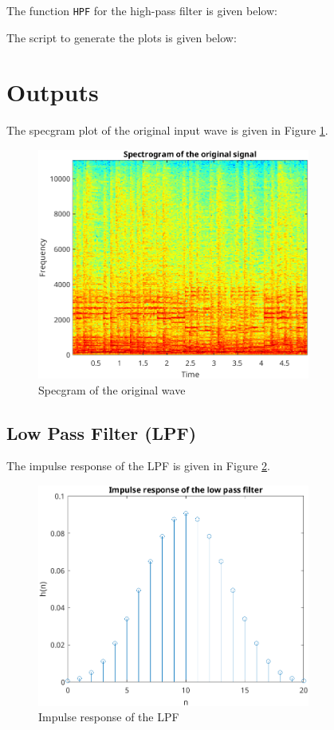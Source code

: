 \documentclass[a4paper,12pt]{article}
\begin{document}
The function \texttt{HPF} for the high-pass filter is given below:


The script to generate the plots is given below:


\section*{Outputs}

The specgram plot of the original input wave is given in Figure \ref{fig:specgramOg}.
\begin{figure}[h]
    \centering
    \includegraphics[width=0.8\textwidth]{figs/specOg.png}
    \caption{Specgram of the original wave}
    \label{fig:specgramOg}
\end{figure}

\subsection*{Low Pass Filter (LPF)}
The impulse response of the LPF is given in Figure \ref{fig:impulseLPF}.
\begin{figure}[h]
    \centering
    \includegraphics[width=0.8\textwidth]{figs/impulseLPF.png}
    \caption{Impulse response of the LPF}
    \label{fig:impulseLPF}
\end{figure}
\end{document}
